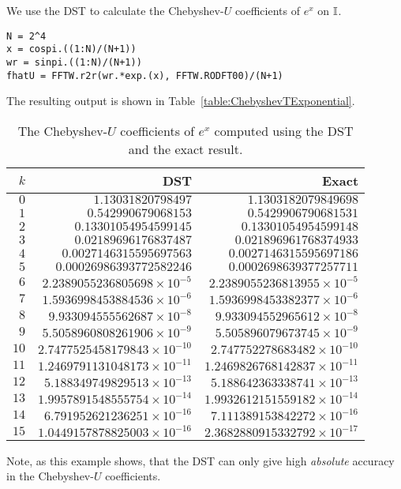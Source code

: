 \begin{example}\label{Example:DST}
We use the DST to calculate the Chebyshev-$U$ coefficients of $e^x$ on $\mathbb{I}$.
\begin{verbatim}
N = 2^4
x = cospi.((1:N)/(N+1))
wr = sinpi.((1:N)/(N+1))
fhatU = FFTW.r2r(wr.*exp.(x), FFTW.RODFT00)/(N+1)
\end{verbatim}
The resulting output is shown in Table~\ref{table:ChebyshevTExponential}.
\begin{table}[htp]
\caption{The Chebyshev-$U$ coefficients of $e^x$ computed using the DST and the exact result.}
\begin{center}
\begin{tabular}{rrr}
\hline
$k$ & DST & Exact\\
\hline
$0$ & $1.13031820798497$ & $1.1303182079849698$\\
$1$ & $0.542990679068153$ & $0.5429906790681531$\\
$2$ & $0.13301054954599145$ & $0.13301054954599148$\\
$3$ & $0.02189696176837487$ & $0.021896961768374933$\\
$4$ & $0.0027146315595697563$ & $0.0027146315595697186$\\
$5$ & $0.00026986393772582246$ & $0.0002698639377257711$\\
$6$ & $2.2389055236805698\times10^{-5}$ & $2.2389055236813955\times10^{-5}$\\
$7$ & $1.5936998453884536\times10^{-6}$ & $1.5936998453382377\times10^{-6}$\\
$8$ & $9.933094555562687\times10^{-8}$ & $9.933094552965612\times10^{-8}$\\
$9$ & $5.5058960808261906\times10^{-9}$ & $5.505896079673745\times10^{-9}$\\
$10$ & $2.7477525458179843\times10^{-10}$ & $2.747752278683482\times10^{-10}$\\
$11$ & $1.2469791131048173\times10^{-11}$ & $1.2469826768142837\times10^{-11}$\\
$12$ & $5.188349749829513\times10^{-13}$ & $5.188642363338741\times10^{-13}$\\
$13$ & $1.9957891548555754\times10^{-14}$ & $1.9932612151559182\times10^{-14}$\\
$14$ & $6.791952621236251\times10^{-16}$ & $7.111389153842272\times10^{-16}$\\
$15$ & $1.0449157878825003\times10^{-16}$ & $2.3682880915332792\times10^{-17}$\\
\hline
\end{tabular}
\end{center}
\label{table:ChebyshevUExponential}
\end{table}%
Note, as this example shows, that the DST can only give high {\em absolute} accuracy in the Chebyshev-$U$ coefficients.
\end{example}

